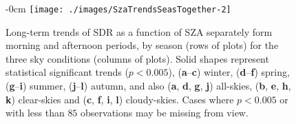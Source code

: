 \begin{figure}[h!]
    \begin{adjustwidth}{-\extralength}{0cm}
        {\centering
            \texttt{[image: ./images/SzaTrendsSeasTogether-2]}
        }
    \end{adjustwidth}
    \caption{Long-term trends of SDR as a function of SZA separately form morning
           and afternoon periods, by season (rows of plots) for the three sky
           conditions (columns of plots).
           Solid shapes represent statistical significant trends ($p<0.005$), (\textbf{a}--\textbf{c}) winter, (\textbf{d}--\textbf{f}) spring, (\textbf{g}--\textbf{i}) summer, (\textbf{j}--\textbf{l}) autumn, and also (\textbf{a}, \textbf{d}, \textbf{g}, \textbf{j}) all-skies, (\textbf{b}, \textbf{e}, \textbf{h}, \textbf{k}) clear-skies and (\textbf{c}, \textbf{f}, \textbf{i}, \textbf{l}) cloudy-skies.
           Cases where $p<0.005$ or with less than $85$ observations may be
           missing from view.}\label{fig:SZAtrendSeason}
\end{figure}




\FloatBarrier

%
